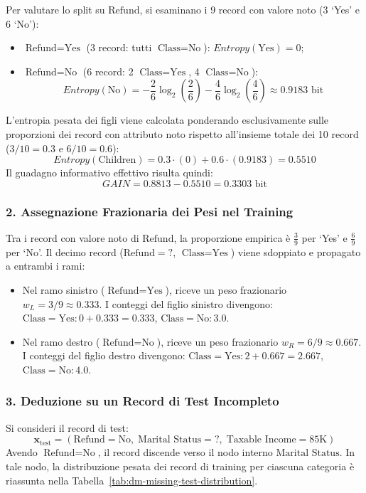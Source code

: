 Per valutare lo split su $\text{Refund}$, si esaminano i 9 record con valore noto (3 `Yes' e 6 `No'):
\begin{itemize}
    \item $\text{Refund} = \text{Yes}$ (3 record: tutti $\text{Class}=\text{No}$): $Entropy(\text{Yes}) = 0$;
    \item $\text{Refund} = \text{No}$ (6 record: 2 $\text{Class}=\text{Yes}$, 4 $\text{Class}=\text{No}$):
    \begin{equation}
        Entropy(\text{No}) = -\frac{2}{6}\log_2\left(\frac{2}{6}\right) - \frac{4}{6}\log_2\left(\frac{4}{6}\right) \approx 0.9183 \text{ bit}
    \end{equation}
\end{itemize}
L'entropia pesata dei figli viene calcolata ponderando esclusivamente sulle proporzioni dei record con attributo noto rispetto all'insieme totale dei 10 record ($3/10 = 0.3$ e $6/10 = 0.6$):
\begin{equation}
    Entropy(\text{Children}) = 0.3 \cdot (0) + 0.6 \cdot (0.9183) = 0.5510
\end{equation}
Il guadagno informativo effettivo risulta quindi:
\begin{equation}
    GAIN = 0.8813 - 0.5510 = 0.3303 \text{ bit}
\end{equation}

\subsubsection{2. Assegnazione Frazionaria dei Pesi nel Training}
Tra i record con valore noto di $\text{Refund}$, la proporzione empirica è $\frac{3}{9}$ per `Yes' e $\frac{6}{9}$ per `No'.
Il decimo record ($\text{Refund}=?$, $\text{Class}=\text{Yes}$) viene sdoppiato e propagato a entrambi i rami:
\begin{itemize}
    \item Nel ramo sinistro ($\text{Refund}=\text{Yes}$), riceve un peso frazionario $w_L = 3/9 \approx 0.333$. I conteggi del figlio sinistro divengono: $\text{Class}=\text{Yes}: 0 + 0.333 = 0.333$, $\text{Class}=\text{No}: 3.0$.
    \item Nel ramo destro ($\text{Refund}=\text{No}$), riceve un peso frazionario $w_R = 6/9 \approx 0.667$. I conteggi del figlio destro divengono: $\text{Class}=\text{Yes}: 2 + 0.667 = 2.667$, $\text{Class}=\text{No}: 4.0$.
\end{itemize}

\subsubsection{3. Deduzione su un Record di Test Incompleto}
Si consideri il record di test:
\begin{equation*}
    \mathbf{x}_{\text{test}} = (\text{Refund}=\text{No}, \; \text{Marital Status}=?, \; \text{Taxable Income}=85\text{K})
\end{equation*}
Avendo $\text{Refund}=\text{No}$, il record discende verso il nodo interno $\text{Marital Status}$. In tale nodo, la distribuzione pesata dei record di training per ciascuna categoria è riassunta nella Tabella~\ref{tab:dm-missing-test-distribution}.

